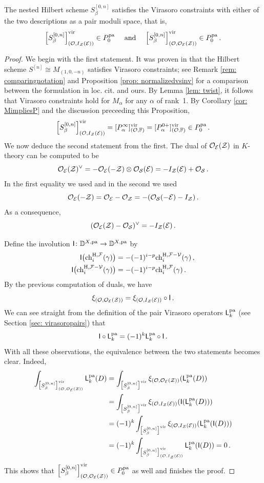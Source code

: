 \documentclass[a4paper, 12pt]{amsart}
\begin{document}
\begin{proposition}\label{prop: nestedhilb}
The nested Hilbert scheme $S_\beta^{[0,n]}$ satisfies the Virasoro constraints with either of the two descriptions as a pair moduli space, that is, 
\[ \Big[S_\beta^{[0,n]}\Big]^{\mathrm{vir}}_{({\mathcal O}, I_{{\mathcal Z}}({\mathcal E}))}\in P_0^{\mathop{\rm pa}\nolimits}\quad\textup{ and } \quad \Big[S_\beta^{[0,n]}\Big]^{\mathrm{vir}}_{({\mathcal O}, {\mathcal O}_{\mathcal E}({\mathcal Z}))}\in P_0^{\mathop{\rm pa}\nolimits}\,.\]
\end{proposition}
\begin{proof}
We begin with the first statement. It was proven in \cite[Theorem 5]{moreira} that the Hilbert scheme $S^{[n]}\cong M_{(1,0, -n)}$ satisfies Virasoro constraints; see Remark \ref{rem: comparingnotation} and Proposition \ref{prop: normalizedvsinv} for a comparison between the formulation in loc. cit. and ours. By Lemma \ref{lem: twist}, it follows that Virasoro constraints hold for $M_\alpha$ for any $\alpha$ of rank~1. By Corollary \ref{cor:  MimpliesP} and the discussion preceeding this Proposition,
\[\Big[S_\beta^{[0,n]}\Big]^{\mathrm{vir}}_{({\mathcal O}, I_{{\mathcal Z}}({\mathcal E}))}=[P_\alpha^\infty]^{\mathrm{vir}}_{({\mathcal O},{\mathbb{F}})}=[P_\alpha^{0+}]^{\mathrm{vir}}_{({\mathcal O},{\mathbb{F}})} \in P_0^{\mathop{\rm pa}\nolimits}\,.\]
We now deduce the second statement from the first. The dual of ${\mathcal O}_{\mathcal E}({\mathcal Z})$ in $K$-theory can be computed to be
\[{\mathcal O}_{\mathcal E}({\mathcal Z})^\vee=-{\mathcal O}_{\mathcal E}(-{\mathcal Z})\otimes {\mathcal O}_{\mathcal S}({\mathcal E})=-I_{\mathcal Z}({\mathcal E})+{\mathcal O}_{\mathcal S}\,.\]
In the first equality we used \cite[Example 3.41]{huyFM} and in the second we used
\[{\mathcal O}_{\mathcal E}(-{\mathcal Z})={\mathcal O}_{\mathcal E}-{\mathcal O}_{\mathcal Z}=-({\mathcal O}_{\mathcal S}(-{\mathcal E})-I_{\mathcal Z})\,.\]
As a consequence,
\[({\mathcal O}_{\mathcal E}({\mathcal Z})-{\mathcal O}_{\mathcal S})^\vee=-I_{\mathcal Z}({\mathcal E})\,.\]

Define the involution ${\mathsf{I}}\colon {\mathbb{D}}^{X, \mathop{\rm pa}\nolimits}\to {\mathbb{D}}^{X, \mathop{\rm pa}\nolimits}$ by
\begin{align*}
{\mathsf{I}}\big(\mathrm{ch}_i^{\mathrm{H}, {\mathcal F}}(\gamma)\big)&=-(-1)^{i-p}\mathrm{ch}_i^{\mathrm{H}, {\mathcal F}-{\mathcal V}}(\gamma)\,,\\
{\mathsf{I}}\big(\mathrm{ch}_i^{\mathrm{H}, {\mathcal F}-{\mathcal V}}(\gamma)\big)&=-(-1)^{i-p}\mathrm{ch}_i^{\mathrm{H}, {\mathcal F}}(\gamma)\,.
\end{align*}
By the previous computation of duals, we have
\[\xi_{({\mathcal O}, {\mathcal O}_{\mathcal E}({\mathcal Z}))}=\xi_{({\mathcal O}, I_{\mathcal Z}({\mathcal E}))}\circ {\mathsf{I}}\,.\]
We can see straight from the definition of the pair Virasoro operators ${\mathsf{L}}_k^{\mathop{\rm pa}\nolimits}$ (see Section \ref{sec: virasoropairs}) that
\[{\mathsf{I}}\circ {\mathsf{L}}_k^{\mathop{\rm pa}\nolimits}=(-1)^k {\mathsf{L}}_k^{\mathop{\rm pa}\nolimits}\circ {\mathsf{I}}\,.\]
With all these observations, the equivalence between the two statements becomes clear. Indeed,
\begin{align*}\int_{\big[S_\beta^{[0,n]}\big]^{\mathrm{vir}}_{({\mathcal O}, {\mathcal O}_{\mathcal E}({\mathcal Z}))}} {\mathsf{L}}_k^{\mathop{\rm pa}\nolimits}(D)&=\int_{\big[S_\beta^{[0,n]}\big]^{\mathrm{vir}}} \xi_{({\mathcal O}, {\mathcal O}_{\mathcal E}({\mathcal Z}))}({\mathsf{L}}_k^{\mathop{\rm pa}\nolimits}(D))\\
&=\int_{\big[S_\beta^{[0,n]}\big]^{\mathrm{vir}}} \xi_{({\mathcal O}, I_{\mathcal Z}({\mathcal E}))}( {\mathsf{I}}({\mathsf{L}}_k^{\mathop{\rm pa}\nolimits}(D)))\\
&=(-1)^k \int_{\big[S_\beta^{[0,n]}\big]^{\mathrm{vir}}} \xi_{({\mathcal O}, I_{\mathcal Z}({\mathcal E}))}( {\mathsf{L}}_k^{\mathop{\rm pa}\nolimits}({\mathsf{I}}(D)))\\
&=(-1)^k \int_{\big[S_\beta^{[0,n]}\big]^{\mathrm{vir}}_{({\mathcal O}, I_{\mathcal Z}({\mathcal E}))}}{\mathsf{L}}_k^{\mathop{\rm pa}\nolimits}({\mathsf{I}}(D))=0\,.
\end{align*}
This shows that $\Big[S_\beta^{[0,n]}\Big]^{\mathrm{vir}}_{({\mathcal O}, {\mathcal O}_{\mathcal E}({\mathcal Z}))}\in P_0^{\mathop{\rm pa}\nolimits}$ as well and finishes the proof.
\qedhere
\end{proof}
\end{document}

